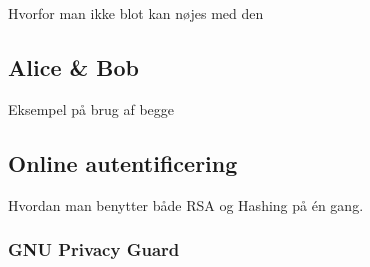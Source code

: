 Hvorfor man ikke blot kan nøjes med den

    \subsection{Alice \& Bob}
    Eksempel på brug af begge

    \subsection{Online autentificering}
    Hvordan man benytter både RSA og Hashing på én gang.

    \subsubsection{GNU Privacy Guard}
